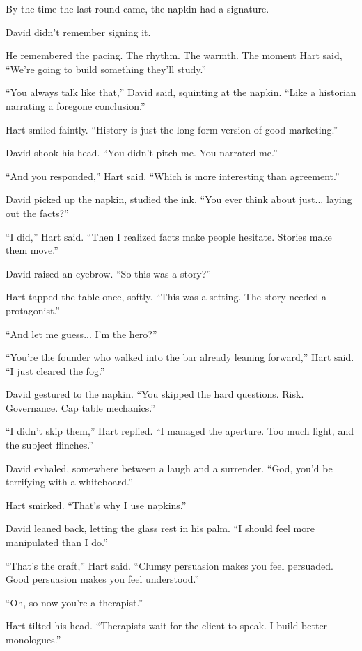 By the time the last round came, the napkin had a signature.

David didn’t remember signing it.

He remembered the pacing. The rhythm. The warmth.
The moment Hart said, ``We’re going to build something they’ll study.''

``You always talk like that,'' David said, squinting at the napkin. ``Like a historian narrating a foregone conclusion.''

Hart smiled faintly. ``History is just the long-form version of good marketing.''

David shook his head. ``You didn’t pitch me. You narrated me.''

``And you responded,'' Hart said. ``Which is more interesting than agreement.''

David picked up the napkin, studied the ink. ``You ever think about just... laying out the facts?''

``I did,'' Hart said. ``Then I realized facts make people hesitate. Stories make them move.''

David raised an eyebrow. ``So this was a story?''

Hart tapped the table once, softly. ``This was a setting. The story needed a protagonist.''

``And let me guess... I’m the hero?''

``You’re the founder who walked into the bar already leaning forward,'' Hart said. ``I just cleared the fog.''

David gestured to the napkin. ``You skipped the hard questions. Risk. Governance. Cap table mechanics.''

``I didn’t skip them,'' Hart replied. ``I managed the aperture. Too much light, and the subject flinches.''

David exhaled, somewhere between a laugh and a surrender. ``God, you’d be terrifying with a whiteboard.''

Hart smirked. ``That’s why I use napkins.''

David leaned back, letting the glass rest in his palm. ``I should feel more manipulated than I do.''

``That’s the craft,'' Hart said. ``Clumsy persuasion makes you feel persuaded. Good persuasion makes you 
feel understood.''

``Oh, so now you’re a therapist.''

Hart tilted his head. ``Therapists wait for the client to speak. I build better monologues.''

